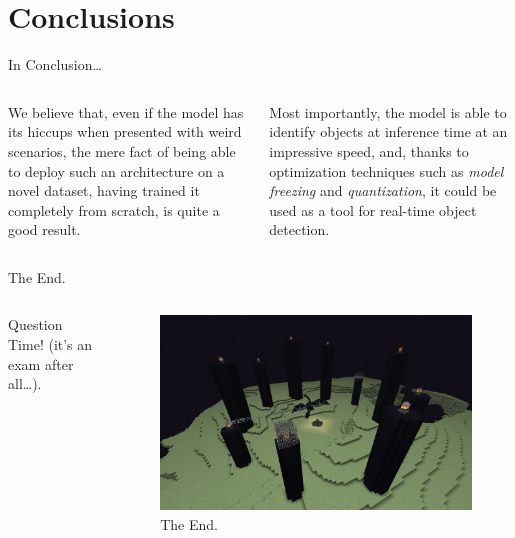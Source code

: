 \documentclass[english]{beamer}
\begin{document}
\section{Conclusions}
\begin{frame}{In Conclusion\dots}
	\begin{columns}
	    
	    \begin{column}{0.5\textwidth}
        We believe that, even if the model has its hiccups when presented with weird scenarios, the mere fact of being able to deploy such an architecture
        on a novel dataset, having trained it completely from scratch, is quite a good result.
	    \end{column}
	
	    \begin{column}{0.5\textwidth}
        Most importantly, the model is able to identify objects at inference time at an impressive speed, and, thanks to optimization techniques such as \emph{model freezing}
        and \emph{quantization}, it could be used as a tool for real-time object detection.
	    \end{column}
	  \end{columns}
\end{frame}


\begin{frame}{The End.}

  \begin{columns}
    
    \begin{column}{0.4\textwidth}
      Question Time! (it's an exam after all\dots).
    \end{column}
    
    \begin{column}{0.6\textwidth}
      \begin{figure}
        \centering
            \includegraphics[width=1.0\textwidth]{images/The_End.jpg}
            \caption{The End.}
        \end{figure}
    \end{column}

  \end{columns}

\end{frame}
\end{document}
